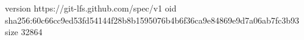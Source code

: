 version https://git-lfs.github.com/spec/v1
oid sha256:60c66cc9ed53fd54144f28b8b1595076b4b6f36ca9e84869e9d7a06ab7fc3b93
size 32864
